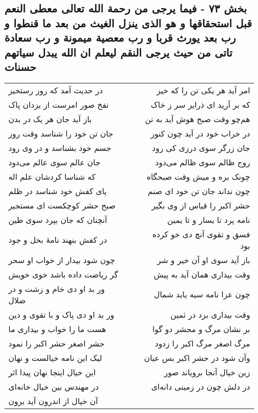 \begin{center}
\section*{بخش ۷۳ - فیما یرجی من رحمة الله تعالی معطی النعم قبل استحقاقها و  هو الذی ینزل الغیث من بعد ما قنطوا و رب بعد یورث قربا و رب  معصیة میمونة و رب سعادة تاتی من حیث یرجی النقم لیعلم ان الله یبدل سیاتهم حسنات}
\label{sec:sh073}
\begin{longtable}{l p{0.5cm} r}
در حدیث آمد که روز رستخیز
&&
امر آید هر یکی تن را که خیز
\\
نفخ صور امرست از یزدان پاک
&&
که بر آرید ای ذرایر سر ز خاک
\\
باز آید جان هر یک در بدن
&&
هم‌چو وقت صبح هوش آید به تن
\\
جان تن خود را شناسد وقت روز
&&
در خراب خود در آید چون کنوز
\\
جسم خود بشناسد و در وی رود
&&
جان زرگر سوی درزی کی رود
\\
جان عالم سوی عالم می‌دود
&&
روح ظالم سوی ظالم می‌دود
\\
که شناسا کردشان علم اله
&&
چونک بره و میش وقت صبحگاه
\\
پای کفش خود شناسد در ظلم
&&
چون نداند جان تن خود ای صنم
\\
صبح حشر کوچکست ای مستجیر
&&
حشر اکبر را قیاس از وی بگیر
\\
آنچنان که جان بپرد سوی طین
&&
نامه پرد تا یسار و تا یمین
\\
در کفش بنهند نامهٔ بخل و جود
&&
فسق و تقوی آنچ دی خو کرده بود
\\
چون شود بیدار از خواب او سحر
&&
باز آید سوی او آن خیر و شر
\\
گر ریاضت داده باشد خوی خویش
&&
وقت بیداری همان آید به پیش
\\
ور بد او دی خام و زشت و در ضلال
&&
چون عزا نامه سیه یابد شمال
\\
ور بد او دی پاک و با تقوی و دین
&&
وقت بیداری برد در ثمین
\\
هست ما را خواب و بیداری ما
&&
بر نشان مرگ و محشر دو گوا
\\
حشر اصغر حشر اکبر را نمود
&&
مرگ اصغر مرگ اکبر را زدود
\\
لیک این نامه خیالست و نهان
&&
وآن شود در حشر اکبر بس عیان
\\
این خیال اینجا نهان پیدا اثر
&&
زین خیال آنجا برویاند صور
\\
در مهندس بین خیال خانه‌ای
&&
در دلش چون در زمینی دانه‌ای
\\
آن خیال از اندرون آید برون

\end{longtable}
\end{center}
